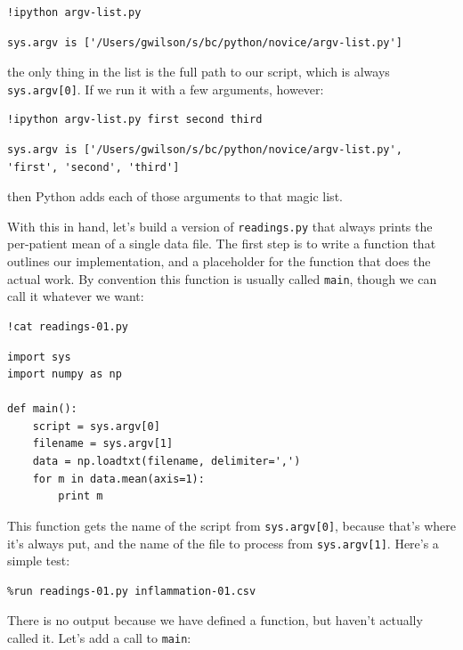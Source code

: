 \documentclass[]{book}
\begin{document}
\begin{verbatim}
!ipython argv-list.py
\end{verbatim}

\begin{verbatim}
sys.argv is ['/Users/gwilson/s/bc/python/novice/argv-list.py']
\end{verbatim}

the only thing in the list is the full path to our script, which is
always \texttt{sys.argv{[}0{]}}. If we run it with a few arguments,
however:

\begin{verbatim}
!ipython argv-list.py first second third
\end{verbatim}

\begin{verbatim}
sys.argv is ['/Users/gwilson/s/bc/python/novice/argv-list.py', 'first', 'second', 'third']
\end{verbatim}

then Python adds each of those arguments to that magic list.

With this in hand, let's build a version of \texttt{readings.py} that
always prints the per-patient mean of a single data file. The first step
is to write a function that outlines our implementation, and a
placeholder for the function that does the actual work. By convention
this function is usually called \texttt{main}, though we can call it
whatever we want:

\begin{verbatim}
!cat readings-01.py
\end{verbatim}

\begin{verbatim}
import sys
import numpy as np

def main():
    script = sys.argv[0]
    filename = sys.argv[1]
    data = np.loadtxt(filename, delimiter=',')
    for m in data.mean(axis=1):
        print m
\end{verbatim}

This function gets the name of the script from \texttt{sys.argv{[}0{]}},
because that's where it's always put, and the name of the file to
process from \texttt{sys.argv{[}1{]}}. Here's a simple test:

\begin{verbatim}
%run readings-01.py inflammation-01.csv
\end{verbatim}

There is no output because we have defined a function, but haven't
actually called it. Let's add a call to \texttt{main}:
\end{document}
